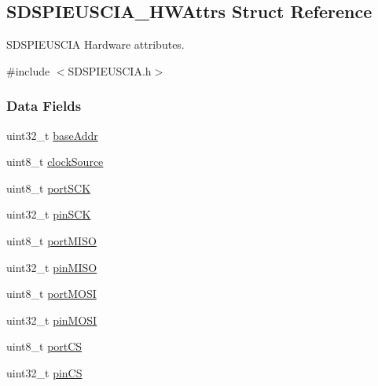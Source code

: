 \subsection{S\+D\+S\+P\+I\+E\+U\+S\+C\+I\+A\+\_\+\+H\+W\+Attrs Struct Reference}
\label{struct_s_d_s_p_i_e_u_s_c_i_a___h_w_attrs}


S\+D\+S\+P\+I\+E\+U\+S\+C\+I\+A Hardware attributes.  




{\ttfamily \#include $<$S\+D\+S\+P\+I\+E\+U\+S\+C\+I\+A.\+h$>$}

\subsubsection*{Data Fields}
\begin{DoxyCompactItemize}
\item 
uint32\+\_\+t \hyperlink{struct_s_d_s_p_i_e_u_s_c_i_a___h_w_attrs_ab236325aef69dbab2cb88596186593d9}{base\+Addr}
\item 
uint8\+\_\+t \hyperlink{struct_s_d_s_p_i_e_u_s_c_i_a___h_w_attrs_aba5596a4f2d57b8832fd3f7e8c5eca86}{clock\+Source}
\item 
uint8\+\_\+t \hyperlink{struct_s_d_s_p_i_e_u_s_c_i_a___h_w_attrs_a3584afb53fee3eb002578f7eabcdd923}{port\+S\+C\+K}
\item 
uint32\+\_\+t \hyperlink{struct_s_d_s_p_i_e_u_s_c_i_a___h_w_attrs_aeace0c995970ae38e9e16bb39d14084f}{pin\+S\+C\+K}
\item 
uint8\+\_\+t \hyperlink{struct_s_d_s_p_i_e_u_s_c_i_a___h_w_attrs_ac525b97dac5dec5b011b3c3b45e7df65}{port\+M\+I\+S\+O}
\item 
uint32\+\_\+t \hyperlink{struct_s_d_s_p_i_e_u_s_c_i_a___h_w_attrs_ad84c140e008423d5d69c8c71912c83a6}{pin\+M\+I\+S\+O}
\item 
uint8\+\_\+t \hyperlink{struct_s_d_s_p_i_e_u_s_c_i_a___h_w_attrs_ae5495a58ab3bc8f23646dfabd24c1394}{port\+M\+O\+S\+I}
\item 
uint32\+\_\+t \hyperlink{struct_s_d_s_p_i_e_u_s_c_i_a___h_w_attrs_abe5be1068e92c174db83a87b430c0c6c}{pin\+M\+O\+S\+I}
\item 
uint8\+\_\+t \hyperlink{struct_s_d_s_p_i_e_u_s_c_i_a___h_w_attrs_a669ad55ec90fcc5c37c13b86f23bad1c}{port\+C\+S}
\item 
uint32\+\_\+t \hyperlink{struct_s_d_s_p_i_e_u_s_c_i_a___h_w_attrs_acc7a51ef098ed1cc7ef4d930fcd2aada}{pin\+C\+S}
\end{DoxyCompactItemize}


